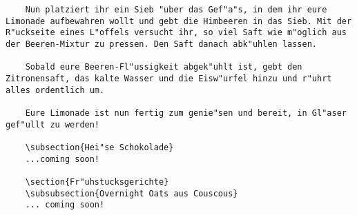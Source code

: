 \begin{verbatim}
	Nun platziert ihr ein Sieb "uber das Gef"a"s, in dem ihr eure Limonade aufbewahren wollt und gebt die Himbeeren in das Sieb. Mit der R"uckseite eines L"offels versucht ihr, so viel Saft wie m"oglich aus der Beeren-Mixtur zu pressen. Den Saft danach abk"uhlen lassen.
	
	Sobald eure Beeren-Fl"ussigkeit abgek"uhlt ist, gebt den Zitronensaft, das kalte Wasser und die Eisw"urfel hinzu und r"uhrt alles ordentlich um.
	
	Eure Limonade ist nun fertig zum genie"sen und bereit, in Gl"aser gef"ullt zu werden!
	
	\subsection{Hei"se Schokolade}
	...coming soon!
	
	\section{Fr"uhstucksgerichte}
	\subsubsection{Overnight Oats aus Couscous}
	... coming soon!
	
	
\end{verbatim}